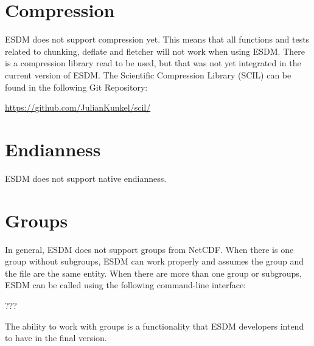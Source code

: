 \section{Compression}

\tab
ESDM does not support compression yet. This means that all functions and tests related to chunking, deflate and fletcher will not work when using ESDM. There is a compression library read to be used, but that was not yet integrated in the current version of ESDM. The Scientific Compression Library (SCIL) can be found in the following Git Repository:

\begin{center}
\url{https://github.com/JulianKunkel/scil/}
\end{center}

\section{Endianness}

\tab
ESDM does not support native endianness.

\section{Groups}

\tab
In general, ESDM does not support groups from NetCDF. When there is one group without subgroups, ESDM can work properly and assumes the group and the file are the same entity. When there are more than one group or subgroups, ESDM can be called using the following command-line interface:

???

The ability to work with groups is a functionality that ESDM developers intend to have in the final version.

